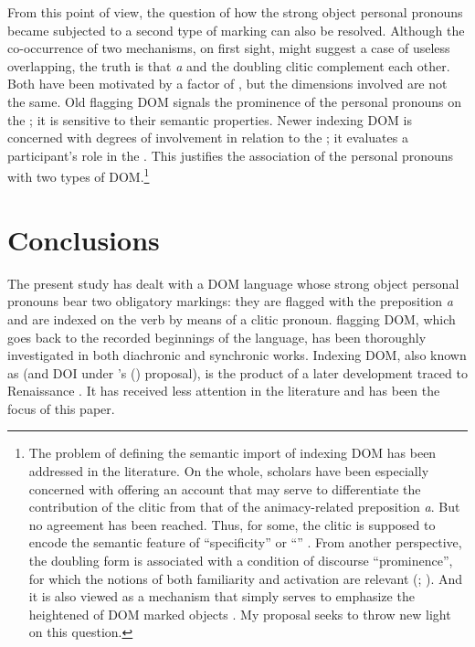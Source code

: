 \documentclass[output=paper]{LSP/langsci}
\begin{document}
 From this point of view, the question of how the strong object personal pronouns became subjected to a second type of marking can also be resolved. Although the co-occurrence of two mechanisms, on first sight, might suggest a case of useless overlapping, the truth is that \textit{a} and the doubling clitic complement each other. Both have been motivated by a factor of , but the dimensions involved are not the same. Old flagging DOM signals the prominence of the personal pronouns on the ; it is sensitive to their semantic properties. Newer indexing DOM is concerned with degrees of involvement in relation to the ; it evaluates a participant’s role in the . This justifies the association of the  personal pronouns with two types of DOM.\footnote{The problem of defining the semantic import of  indexing DOM has been addressed in the literature. On the whole, scholars have been especially concerned with offering an account that may serve to differentiate the contribution of the clitic from that of the animacy-related preposition \textit{a}. But no agreement has been reached. Thus, for some, the clitic is supposed to encode the semantic feature of “specificity” \citep{Suner1988Agreement} or “” \citep{vonHeusingeretal2003Interaction,Leonetti2008Specificity}. From another perspective, the doubling form is associated with a condition of discourse “prominence”, for which the notions of both familiarity and activation are relevant (\citealt{Anagnostopoulou1999Conditions}; \cf \citealt{vonHeusingeretal2008Triggering}). And it is also viewed as a mechanism that simply serves to emphasize the heightened  of DOM marked objects \citep{Escandell-Vidal2009Differential}. 
My proposal seeks to throw new light on this question.} 

\largerpage
\section{Conclusions}
\label{04-me-sec:5}

The present study has dealt with a DOM language whose strong object personal pronouns bear two obligatory markings: they are flagged with the preposition \textit{a} and are indexed on the verb by means of a clitic pronoun.  flagging DOM, which goes back to the recorded beginnings of the language, has been thoroughly investigated in both diachronic and synchronic works. Indexing DOM, also known as  (and DOI under \citeauthor{Iemmolo2014Dislocated}'s (\citeyear{Iemmolo2014Dislocated}) proposal), is the product of a later development traced to Renaissance . It has received less attention in the literature and has been the focus of this paper.
\end{document}
